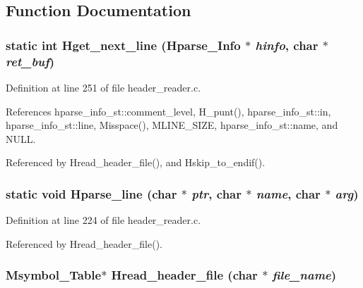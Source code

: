 \subsection{Function Documentation}
\subsubsection{\setlength{\rightskip}{0pt plus 5cm}static int Hget\_\-next\_\-line (\bf{Hparse\_\-Info} $\ast$ {\em hinfo}, char $\ast$ {\em ret\_\-buf})\hspace{0.3cm}{\tt  [static]}}\label{header__reader_8c_16e5e39843597bfa0f4d56d91502b4ed}




Definition at line 251 of file header\_\-reader.c.

References hparse\_\-info\_\-st::comment\_\-level, H\_\-punt(), hparse\_\-info\_\-st::in, hparse\_\-info\_\-st::line, Misspace(), MLINE\_\-SIZE, hparse\_\-info\_\-st::name, and NULL.

Referenced by Hread\_\-header\_\-file(), and Hskip\_\-to\_\-endif().
\subsubsection{\setlength{\rightskip}{0pt plus 5cm}static void Hparse\_\-line (char $\ast$ {\em ptr}, char $\ast$ {\em name}, char $\ast$ {\em arg})\hspace{0.3cm}{\tt  [static]}}\label{header__reader_8c_483c6ed64a0362299c11a4aaf7b60b3d}




Definition at line 224 of file header\_\-reader.c.

Referenced by Hread\_\-header\_\-file().
\subsubsection{\setlength{\rightskip}{0pt plus 5cm}\bf{Msymbol\_\-Table}$\ast$ Hread\_\-header\_\-file (char $\ast$ {\em file\_\-name})}\label{header__reader_8c_2e6daf4ca9e19d27b1a6df7911acff59}




